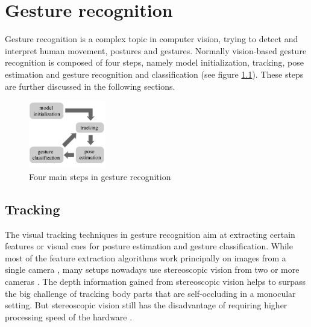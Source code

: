 \chapter{Gesture recognition}
\label{chap:gesture-recognition}

Gesture recognition is a complex topic in computer vision, trying to detect and interpret human movement, postures and gestures. Normally vision-based gesture recognition is composed of four steps, namely model initialization, tracking, pose estimation and gesture recognition and classification \cite{Moeslund} (see figure \ref{fig:4steps}). These steps are further discussed in the following sections.
\begin{figure}[h!]
\center
\includegraphics[width=0.3\textwidth]{images/seminar/4steps.png}
\caption{Four main steps in gesture recognition}
\label{fig:4steps}
\end{figure}


\section{Tracking}
\label{sec:tracking}

The visual tracking techniques in gesture recognition aim at extracting certain features or visual cues for posture estimation and gesture classification. While most of the feature extraction algorithms work principally on images from a single camera \cite{Schmidt}, many setups nowadays use stereoscopic vision from two or more cameras \cite{Chien, VandenBergh}. The depth information gained from stereoscopic vision helps to surpass the big challenge of tracking body parts that are self-occluding in a monocular setting. But stereoscopic vision still has the disadvantage of requiring higher processing speed of the hardware \cite{Schmidt}. %

